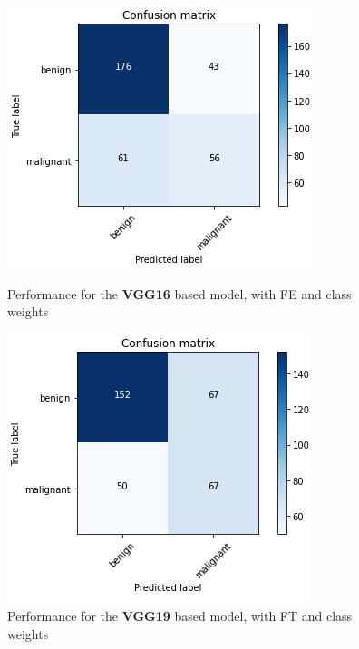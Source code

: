\documentclass[11pt,a4paper,oneside]{article}
\begin{document}
\begin{figure}[h]
	\begin{minipage}[c]{.4\textwidth}
		\centering\setlength{\captionmargin}{0pt}%
		\includegraphics[width=.9\textwidth]{images/Task 3/VGG16 3.2/Conf_Matrix}
		\caption{Performance for the \textbf{VGG16} based model, with FE and class weights}
		\label{fig:vgg16_3.2}
	\end{minipage}
	\hspace{5mm}%
	\begin{minipage}[c]{.4\textwidth}
		\centering\setlength{\captionmargin}{0pt}%
		\includegraphics[width=.9\textwidth]{images/Task 3/VGG19 3.2/Conf_Matrix}
		\caption{Performance for the \textbf{VGG19} based model, with FT and class weights}
		\label{fig:vgg19_3.2}
	\end{minipage}
\end{figure}
\end{document}
